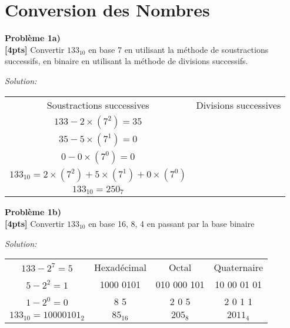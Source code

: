 \documentclass{article}
\newenvironment{problem}[2][Problème]
    { \begin{mdframed}[backgroundcolor=gray!20] \textbf{#1 #2} \\}
    {  \end{mdframed}}
\newenvironment{solution}
    {\textit{Solution:}}
    {}
\begin{document}
\section{Conversion des Nombres}

\begin{problem}{1a)}
\textbf{[4pts]} Convertir $133_{10}$ en base 7 en utilisant la méthode de soustractions successifs, en binaire en utilisant la méthode de divisions successifs.
\end{problem}
\begin{solution}
    \begin{tabular}{c|c}
        Soustractions successives & Divisions successives\\
        $133 - 2\times(7^2) = 35$ & \\
        $35 - 5\times(7^1) = 0$ & \\
        $0 - 0\times(7^0) = 0$ & \\
        $133_{10} = 2\times(7^2) + 5\times(7^1) + 0\times(7^0)$ & \\
        $133_{10} = 250_7$ & 
    \end{tabular}
\end{solution}

\begin{problem}{1b)}
\textbf{[4pts]} Convertir $133_{10}$ en base 16, 8, 4 en passant par la base binaire
\end{problem}
\begin{solution}
    \begin{tabular}{cc|c|c}
    $133-2^7=5$ & Hexadécimal & Octal & Quaternaire\\
    $5-2^2 = 1$ & 1000 0101 & 010 000 101 & 10 00 01 01\\
    $1-2^0 = 0$ & 8 \hspace{14pt} 5 & 2 \hspace{6pt} 0 \hspace{6pt} 5 & 2 \hspace{4pt}0 \hspace{4pt}1 \hspace{4pt}1\\
    $133_{10} = 10000101_2$ & $85_{16}$ & $205_8$ & $2011_4$
    \end{tabular}
\end{solution}
\end{document}
